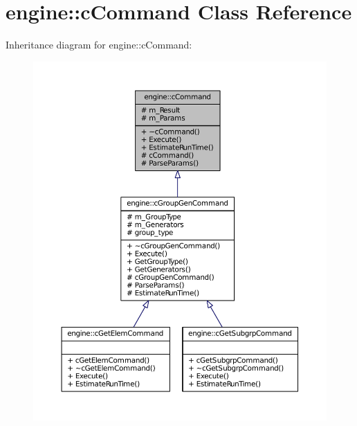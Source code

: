 \hypertarget{classengine_1_1cCommand}{
\section{engine\-:\-:c\-Command \-Class \-Reference}
\label{classengine_1_1cCommand}
}


\-Inheritance diagram for engine\-:\-:c\-Command\-:\nopagebreak
\begin{figure}[H]
\begin{center}
\leavevmode
\includegraphics[width=350pt]{classengine_1_1cCommand__inherit__graph}
\end{center}
\end{figure}


